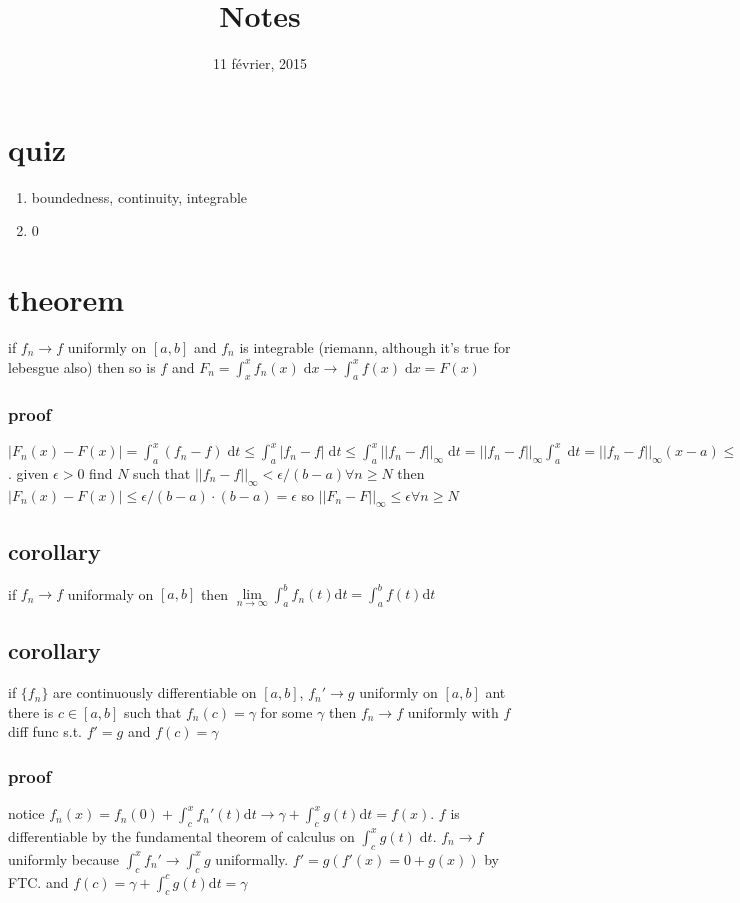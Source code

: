 \documentclass[letterpaper]{article}
\begin{document}
\title{Notes}
\date{11 février, 2015}
\maketitle
\section*{quiz}
\begin{enumerate}
\item
boundedness, continuity, integrable
\item
0
\end{enumerate}

\section*{theorem}
if $f_n\to f$ uniformly on $[a,b]$ and $f_n$ is integrable (riemann, although it's true for lebesgue also) then so is $f$ and $F_n=\int_x^x{f_n(x)\;\mathrm{d}x}\to\int_a^x{f(x)\;\mathrm{d}x}=F(x)$

\subsubsection*{proof}
$|F_n(x)-F(x)|=
\int_a^x{(f_n-f)\;\mathrm{d}t}
\le \int_a^x{|f_n-f|\;\mathrm{d}t}
\le \int_a^x{||f_n-f||_\infty\;\mathrm{d}t}
=||f_n-f||_\infty\int_a^x{\;\mathrm{d}t}
=||f_n-f||_{\infty}(x-a)\le||f_n-f||_{\infty}(b-a)$.
given $\epsilon>0$ find $N$ such that
$||f_n-f||_{\infty}<\epsilon/(b-a)\forall n\ge N$ then
$|F_n(x)-F(x)|\le \epsilon/(b-a)\cdot (b-a)=\epsilon$
so $||F_n-F||_{\infty}\le\epsilon\forall n\ge N$


\subsection*{corollary}
if $f_n\to f$ uniformaly on $[a,b]$ then $\lim\limits_{n\to\infty}\int_a^b{f_n(t)\mathrm{d}t}=\int_a^b{f(t)\mathrm{d}t}$
\subsection*{corollary}
if $\{f_n\}$ are continuously differentiable on $[a,b]$, $f_n'\to g$ uniformly  on $[a,b]$ ant there is $c\in [a,b]$ such that $f_n(c)=\gamma$ for some $\gamma$ then $f_n\to f$ uniformly with $f$ diff func s.t. $f'=g$ and $f(c)=\gamma$

\subsubsection*{proof}
notice $f_n(x)=f_n(0)+\int_c^x{f_n'(t)\mathrm{d}t}\to\gamma+\int_c^x{g(t)\mathrm{d}t}=f(x)$. $f$ is differentiable by the fundamental theorem of calculus on $\int_c^x{g(t)\;\mathrm{d}t}$. $f_n\to f$ uniformly because $\int_c^x{f_n'}\to\int_c^x{g}$ uniformally. $f'=g(f'(x)=0+g(x))$ by FTC. and $f(c)=\gamma+\int_c^c{g(t)\mathrm{d}t}=\gamma$
\end{document}
